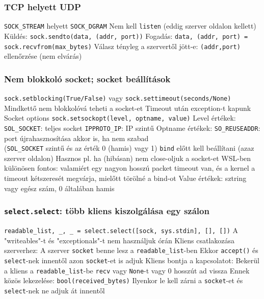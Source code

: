 \documentclass[12pt,a4paper]{article}
\begin{document}
\subsubsection{TCP helyett UDP}

\begin{outline}
	\1 \texttt{SOCK\_STREAM} helyett \texttt{SOCK\_DGRAM}
	\1 Nem kell \texttt{listen} (eddig szerver oldalon kellett)
	\1 Küldés: \texttt{sock.sendto(data, (addr, port))}
	\1 Fogadás: \texttt{data, (addr, port) = sock.recvfrom(max\_bytes)}
	\1 Válasz tényleg a szervertől jött-e: \texttt{(addr,port)} ellenőrzése (nem elvárás)
\end{outline}

\pagebreak

\subsubsection{Nem blokkoló socket; socket beállítások}

\begin{outline}
	\1 \texttt{sock.setblocking(True/False)} vagy \texttt{sock.settimeout(seconds/None)}
		\2 Mindkettő nem blokkolóvá teheti a socket-et
		\2 Timeout után exception-t kapunk
	\1 Socket options
		\2 \texttt{sock.setsockopt(level, optname, value)}
		\2 Level értékek:
			\3 \texttt{SOL\_SOCKET}: teljes socket
			\3 \texttt{IPPROTO\_IP}: IP szintű
		\2 Optname értékek:
			\3 \texttt{SO\_REUSEADDR}: port újrahasznosítása akkor is, ha nem szabad\\
			(\texttt{SOL\_SOCKET} szintű és az érték 0 (hamis) vagy 1)
				\4 \texttt{bind} előtt kell beállítani (azaz szerver oldalon)
				\4 Hasznos pl. ha (hibásan) nem close-oljuk a socket-et
				\4 WSL-ben különösen fontos: valamiért egy nagyon hosszú packet timeout van, és a kernel a timeout kétszeresét megvárja, mielőtt törölné a bind-ot
		\2 Value értékek: sztring vagy egész szám, 0 általában hamis
\end{outline}

\subsubsection{\texttt{select.select}: több kliens kiszolgálása egy szálon}

\begin{outline}
	\1 \texttt{readable\_list, \_, \_ = select.select([sock, sys.stdin], [], [])}
		\2 A "writeables"-t és "exceptionals"-t nem használjuk órán
	\1 Kliens csatlakozása szerverhez:
		\2 A szerver \texttt{socket} benne lesz a \texttt{readable\_list}-ben
		\2 Ekkor \texttt{accept()} és \texttt{select}-nek innentől azon \texttt{socket}-et is adjuk
	\1 Kliens bontja a kapcsolatot:
		\2 Bekerül a kliens a \texttt{readable\_list}-be
		\2 \texttt{recv} vagy \texttt{None}-t vagy 0 hosszút ad vissza
			\3 Ennek közös lekezelése: \texttt{bool(received\_bytes)}
		\2 Ilyenkor le kell zárni a \texttt{socket}-et és \texttt{select}-nek ne adjuk át innentől
\end{outline}
\end{document}
